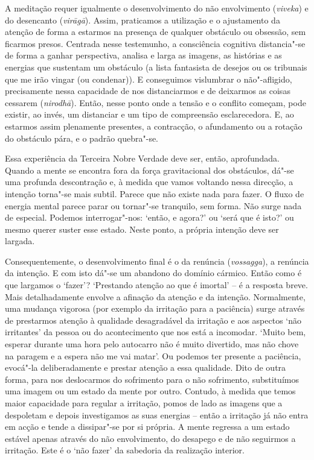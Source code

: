A meditação requer igualmente o desenvolvimento do não envolvimento (\emph{viveka}) e do desencanto (\emph{virāgā}). Assim, praticamos a utilização e o ajustamento da atenção de forma a estarmos na presença de qualquer obstáculo ou obsessão, sem ficarmos presos. Centrada nesse testemunho, a consciência cognitiva distancia"-se de forma a ganhar perspectiva, analisa e larga as imagens, as histórias e as energias que sustentam um obstáculo (a lista fantasista de desejos ou os tribunais que me irão vingar (ou condenar)). E conseguimos vislumbrar o não"-afligido, precisamente nessa capacidade de nos distanciarmos e de deixarmos as coisas cessarem (\emph{nirodhā}). Então, nesse ponto onde a tensão e o conflito começam, pode existir, ao invés, um distanciar e um tipo de compreensão esclarecedora. E, ao estarmos assim plenamente presentes, a contracção, o afundamento ou a rotação do obstáculo pára, e o padrão quebra"-se.

Essa experiência da Terceira Nobre Verdade deve ser, então, aprofundada. Quando a mente se encontra fora da força gravitacional dos obstáculos, dá"-se uma profunda descontração e, à medida que vamos voltando nessa direcção, a intenção torna"-se mais subtil. Parece que não existe nada para fazer. O fluxo de energia mental parece parar ou tornar"-se tranquilo, sem forma. Não surge nada de especial. Podemos interrogar"-nos: `então, e agora?' ou `será que é isto?' ou mesmo querer suster esse estado. Neste ponto, a própria intenção deve ser largada.

Consequentemente, o desenvolvimento final é o da renúncia (\emph{vossagga}), a renúncia da intenção. E com isto dá"-se um abandono do domínio cármico. Então como é que largamos o `fazer'? `Prestando atenção ao que é imortal' -- é a resposta breve. Mais detalhadamente envolve a afinação da atenção e da intenção. Normalmente, uma mudança vigorosa (por exemplo da irritação para a paciência) surge através de prestarmos atenção à qualidade desagradável da irritação e aos aspectos `não irritantes' da pessoa ou do acontecimento que nos está a incomodar. `Muito bem, esperar durante uma hora pelo autocarro não é muito divertido, mas não chove na paragem e a espera não me vai matar'. Ou podemos ter presente a paciência, evocá"-la deliberadamente e prestar atenção a essa qualidade. Dito de outra forma, para nos deslocarmos do sofrimento para o não sofrimento, substituímos uma imagem ou um estado da mente por outro. Contudo, à medida que temos maior capacidade para regular a irritação, pomos de lado as imagens que a despoletam e depois investigamos as suas energias -- então a irritação já não entra em acção e tende a dissipar"-se por si própria. A mente regressa a um estado estável apenas através do não envolvimento, do desapego e de não seguirmos a irritação. Este é o `não fazer' da sabedoria da realização interior.

